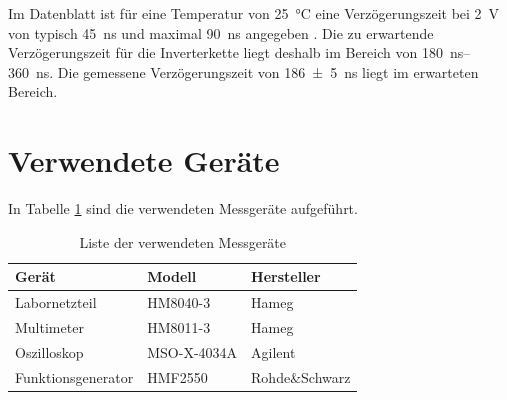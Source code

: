 \documentclass[paper=a4,oneside,abstract,DIV=19,parskip=half]{scrartcl}
\begin{document}
Im Datenblatt ist für eine Temperatur von \SI{25}{\celsius} eine Verzögerungszeit bei \SI{2}{\V} von typisch \SI{45}{\ns} und maximal \SI{90}{\ns} angegeben \cite[Kapitel 6.7 Switching Characteristics - Commercial]{ti74hc00}. Die zu erwartende Verzögerungszeit für die Inverterkette liegt deshalb im Bereich von \qtyrange{180}{360}{\ns}. Die gemessene Verzögerungszeit von \SI{186(5)}{\ns} liegt im erwarteten Bereich.

\section{Verwendete Geräte}

In Tabelle \ref{tab:messg} sind die verwendeten Messgeräte aufgeführt.

\begin{table}[!htb]
\caption{Liste der verwendeten Messgeräte}
\label{tab:messg}
\centering
\begin{tabular}{lll}
Gerät & Modell & Hersteller \\\hline
Labornetzteil & HM8040-3 & Hameg \\
Multimeter  & HM8011-3 & Hameg \\
Oszilloskop & MSO-X-4034A & Agilent\\
Funktionsgenerator & HMF2550 & Rohde\&Schwarz
\end{tabular}
\end{table}


\printbibliography
\end{document}
